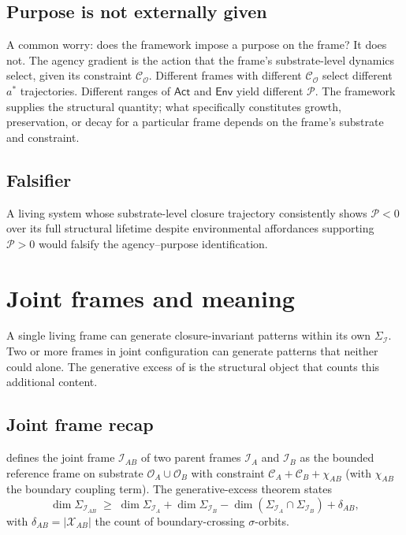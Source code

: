 \documentclass[11pt]{article}
\theoremstyle{plain}
\theoremstyle{definition}
\theoremstyle{remark}
\newcommand{\Ical}{\mathcal{I}}
\newcommand{\Ocal}{\mathcal{O}}
\newcommand{\Ccal}{\mathcal{C}}
\newcommand{\Pcal}{\mathcal{P}}
\newcommand{\Xcal}{\mathcal{X}}
\begin{document}
\subsection{Purpose is not externally given}

A common worry: does the framework impose a purpose on the frame? It does not. The agency gradient is the action that the frame's substrate-level dynamics select, given its constraint $\Ccal_\Ocal$. Different frames with different $\Ccal_\Ocal$ select different $a^*$ trajectories. Different ranges of $\mathsf{Act}$ and $\mathsf{Env}$ yield different $\Pcal$. The framework supplies the structural quantity; what specifically constitutes growth, preservation, or decay for a particular frame depends on the frame's substrate and constraint.

\subsection{Falsifier}

A living system whose substrate-level closure trajectory consistently shows $\Pcal < 0$ over its full structural lifetime despite environmental affordances supporting $\Pcal > 0$ would falsify the agency--purpose identification.

\section{Joint frames and meaning}\label{sec:joint-meaning}

A single living frame can generate closure-invariant patterns within its own $\Sigma_\Ical$. Two or more frames in joint configuration can generate patterns that neither could alone. The generative excess of \citet{SmartExistenceClosure} is the structural object that counts this additional content.

\subsection{Joint frame recap}

\citet{SmartExistenceClosure} defines the joint frame $\Ical_{AB}$ of two parent frames $\Ical_A$ and $\Ical_B$ as the bounded reference frame on substrate $\Ocal_A \cup \Ocal_B$ with constraint $\Ccal_A + \Ccal_B + \chi_{AB}$ (with $\chi_{AB}$ the boundary coupling term). The generative-excess theorem states
\[
  \dim \Sigma_{\Ical_{AB}} \;\geq\; \dim \Sigma_{\Ical_A} + \dim \Sigma_{\Ical_B} - \dim(\Sigma_{\Ical_A} \cap \Sigma_{\Ical_B}) + \delta_{AB},
\]
with $\delta_{AB} = |\Xcal_{AB}|$ the count of boundary-crossing $\sigma$-orbits.
\end{document}
